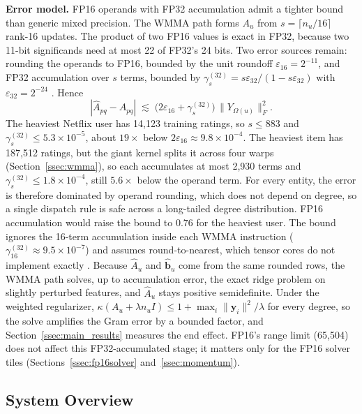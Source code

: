 \textbf{Error model.} FP16 operands with FP32 accumulation admit a tighter bound than generic mixed precision. The WMMA path forms $A_u$ from $s = \lceil n_u/16 \rceil$ rank-16 updates. The product of two FP16 values is exact in FP32, because two 11-bit significands need at most 22 of FP32's 24 bits. Two error sources remain: rounding the operands to FP16, bounded by the unit roundoff $\varepsilon_{16} = 2^{-11}$, and FP32 accumulation over $s$ terms, bounded by $\gamma_s^{(32)} = s \varepsilon_{32}/(1 - s \varepsilon_{32})$ with $\varepsilon_{32} = 2^{-24}$ \cite{blanchard2020mixed,higham2002accuracy}. Hence
\begin{equation}
|\hat{A}_{pq} - A_{pq}| \;\lesssim\; \bigl( 2\varepsilon_{16} + \gamma_s^{(32)} \bigr)\, \lVert Y_{\Omega(u)} \rVert_F^{2}.
\label{eq:error_bound}
\end{equation}
The heaviest Netflix user has 14{,}123 training ratings, so $s \le 883$ and $\gamma_s^{(32)} \le 5.3 \times 10^{-5}$, about $19\times$ below $2\varepsilon_{16} \approx 9.8 \times 10^{-4}$. The heaviest item has 187{,}512 ratings, but the giant kernel splits it across four warps (Section~\ref{ssec:wmma}), so each accumulates at most 2{,}930 terms and $\gamma_s^{(32)} \le 1.8 \times 10^{-4}$, still $5.6\times$ below the operand term. For every entity, the error is therefore dominated by operand rounding, which does not depend on degree, so a single dispatch rule is safe across a long-tailed degree distribution. FP16 accumulation would raise the bound to $0.76$ for the heaviest user. The bound ignores the 16-term accumulation inside each WMMA instruction ($\gamma_{16}^{(32)} \approx 9.5 \times 10^{-7}$) and assumes round-to-nearest, which tensor cores do not implement exactly \cite{markidis2018nvidia}. Because $\hat{A}_u$ and $\hat{\mathbf{b}}_u$ come from the same rounded rows, the WMMA path solves, up to accumulation error, the exact ridge problem on slightly perturbed features, and $\hat{A}_u$ stays positive semidefinite. Under the weighted regularizer, $\kappa(A_u + \lambda n_u I) \le 1 + \max_i \lVert \mathbf{y}_i \rVert^{2}/\lambda$ for every degree, so the solve amplifies the Gram error by a bounded factor, and Section~\ref{ssec:main_results} measures the end effect. FP16's range limit (65{,}504) does not affect this FP32-accumulated stage; it matters only for the FP16 solver tiles (Sections~\ref{ssec:fp16solver} and~\ref{ssec:momentum}).

\subsection{System Overview}
\label{ssec:framework}

